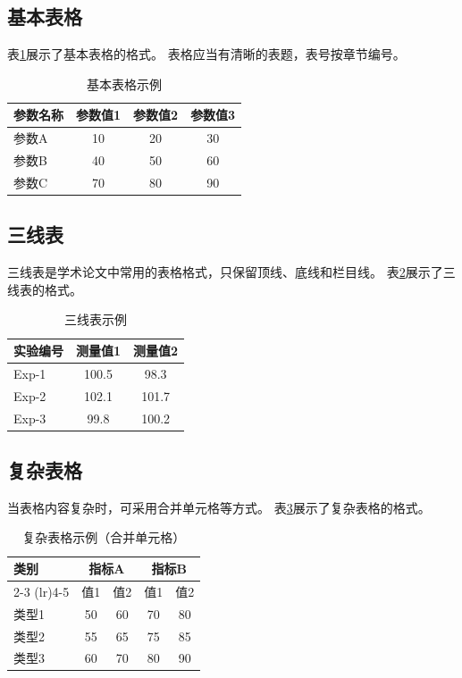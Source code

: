\subsection{基本表格}
表\ref{tab:basic_table}展示了基本表格的格式。
表格应当有清晰的表题，表号按章节编号。

\begin{table}[htbp]
    \caption{基本表格示例}
    \label{tab:basic_table}
    \centering
    \begin{tabular}{lccc}
        \toprule
        参数名称 & 参数值1 & 参数值2 & 参数值3 \\
        \midrule
        参数A & 10 & 20 & 30 \\
        参数B & 40 & 50 & 60 \\
        参数C & 70 & 80 & 90 \\
        \bottomrule
    \end{tabular}
\end{table}

\subsection{三线表}
三线表是学术论文中常用的表格格式，只保留顶线、底线和栏目线。
表\ref{tab:three_line_table}展示了三线表的格式。

\begin{table}[htbp]
    \caption{三线表示例}
    \label{tab:three_line_table}
    \centering
    \begin{tabular}{lcc}
        \toprule
        实验编号 & 测量值1 & 测量值2 \\
        \midrule
        Exp-1 & 100.5 & 98.3 \\
        Exp-2 & 102.1 & 101.7 \\
        Exp-3 & 99.8 & 100.2 \\
        \bottomrule
    \end{tabular}
\end{table}

\subsection{复杂表格}
当表格内容复杂时，可采用合并单元格等方式。
表\ref{tab:complex_table}展示了复杂表格的格式。

\begin{table}[htbp]
    \caption{复杂表格示例（合并单元格）}
    \label{tab:complex_table}
    \centering
    \begin{tabular}{lcccc}
        \toprule
        \multirow{2}{*}{类别} & \multicolumn{2}{c}{指标A} & \multicolumn{2}{c}{指标B} \\
        \cmidrule(lr){2-3} \cmidrule(lr){4-5}
        & 值1 & 值2 & 值1 & 值2 \\
        \midrule
        类型1 & 50 & 60 & 70 & 80 \\
        类型2 & 55 & 65 & 75 & 85 \\
        类型3 & 60 & 70 & 80 & 90 \\
        \bottomrule
    \end{tabular}
\end{table}

